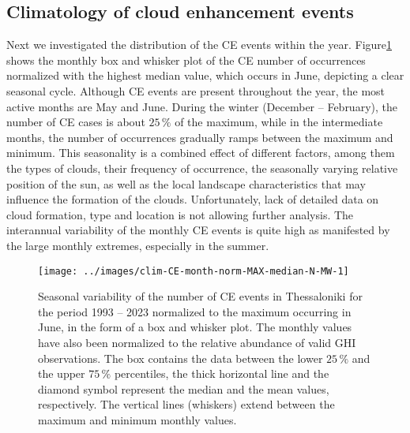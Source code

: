 \documentclass[preprint, 5p,
authoryear]{elsarticle} %
\begin{document}
\hypertarget{climatology-of-cloud-enhancement-events}{%
\subsection{Climatology of cloud enhancement
events}\label{climatology-of-cloud-enhancement-events}}

Next we investigated the distribution of the CE events within the year.
Figure\nobreakspace{}\ref{fig:relative-month-occurrences} shows the
monthly box and whisker plot of the CE number of occurrences normalized
with the highest median value, which occurs in June, depicting a clear
seasonal cycle. Although CE events are present throughout the year, the
most active months are May and June. During the winter (December --
February), the number of CE cases is about \(25\,\%\) of the maximum,
while in the intermediate months, the number of occurrences gradually
ramps between the maximum and minimum. This seasonality is a combined
effect of different factors, among them the types of clouds, their
frequency of occurrence, the seasonally varying relative position of the
sun, as well as the local landscape characteristics that may influence
the formation of the clouds. Unfortunately, lack of detailed data on
cloud formation, type and location is not allowing further analysis. The
interannual variability of the monthly CE events is quite high as
manifested by the large monthly extremes, especially in the summer.

\begin{figure}

{\centering \texttt{[image: ../images/clim-CE-month-norm-MAX-median-N-MW-1]} 

}

\caption{Seasonal variability of the number of CE events in Thessaloniki for the period 1993 -- 2023 normalized to the maximum occurring in June, in the form of a box and whisker plot. The monthly values have also been normalized to the relative abundance of valid GHI observations. The box contains the data between the lower $25\,\%$ and the upper $75\,\%$ percentiles, the thick horizontal line and the diamond symbol represent the median and the mean values, respectively. The vertical lines (whiskers) extend between the maximum and minimum monthly values.}\label{fig:relative-month-occurrences}
\end{figure}
\end{document}
